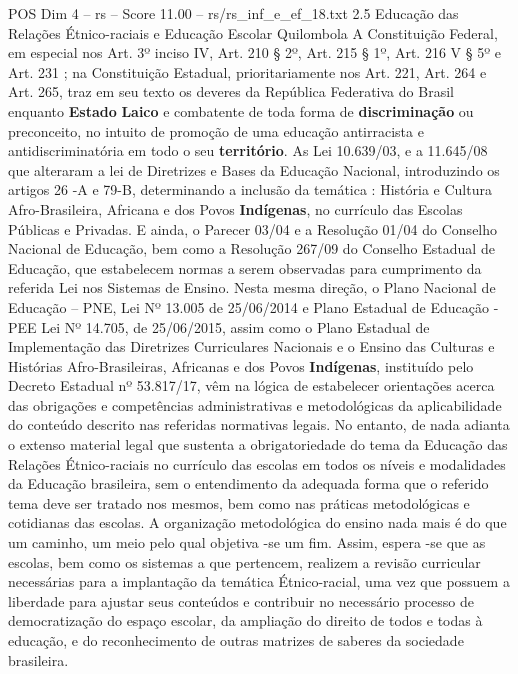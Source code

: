 \begin{textsample}{POS Dim 4 – rs – Score 11.00 – rs/rs\_inf\_e\_ef\_18.txt}  \label{ex:f4_pos_093}
2.5 Educação das Relações Étnico-raciais e Educação Escolar Quilombola A Constituição Federal, em especial nos Art. 3º inciso IV, Art. 210 § 2º, Art. 215 § 1º, Art. 216 V § 5º e Art. 231 ; na Constituição Estadual, prioritariamente nos Art. 221, Art. 264 e Art. 265, traz em seu texto os deveres da República Federativa do Brasil enquanto \textbf{Estado} \textbf{Laico} e combatente de toda forma de \textbf{discriminação} ou preconceito, no intuito de promoção de uma educação antirracista e antidiscriminatória em todo o seu \textbf{território}.
As Lei 10.639/03, e a 11.645/08 que alteraram a lei de Diretrizes e Bases da Educação Nacional, introduzindo os artigos 26 -A e 79-B, determinando a inclusão da temática : História e Cultura Afro-Brasileira, Africana e dos Povos \textbf{Indígenas}, no currículo das Escolas Públicas e Privadas.
E ainda, o Parecer 03/04 e a Resolução 01/04 do Conselho Nacional de Educação, bem como a Resolução 267/09 do Conselho Estadual de Educação, que estabelecem normas a serem observadas para cumprimento da referida Lei nos Sistemas de Ensino.
Nesta mesma direção, o Plano Nacional de Educação – PNE, Lei Nº 13.005 de 25/06/2014 e Plano Estadual de Educação - PEE Lei Nº 14.705, de 25/06/2015, assim como o Plano Estadual de Implementação das Diretrizes Curriculares Nacionais e o Ensino das Culturas e Histórias Afro-Brasileiras, Africanas e dos Povos \textbf{Indígenas}, instituído pelo Decreto Estadual nº 53.817/17, vêm na lógica de estabelecer orientações acerca das obrigações e competências administrativas e metodológicas da aplicabilidade do conteúdo descrito nas referidas normativas legais.
No entanto, de nada adianta o extenso material legal que sustenta a obrigatoriedade do tema da Educação das Relações Étnico-raciais no currículo das escolas em todos os níveis e modalidades da Educação brasileira, sem o entendimento da adequada forma que o referido tema deve ser tratado nos mesmos, bem como nas práticas metodológicas e cotidianas das escolas.
A organização metodológica do ensino nada mais é do que um caminho, um meio pelo qual objetiva -se um fim.
Assim, espera -se que as escolas, bem como os sistemas a que pertencem, realizem a revisão curricular necessárias para a implantação da temática Étnico-racial, uma vez que possuem a liberdade para ajustar seus conteúdos e contribuir no necessário processo de democratização do espaço escolar, da ampliação do direito de todos e todas à educação, e do reconhecimento de outras matrizes de saberes da sociedade brasileira.

\end{textsample}
